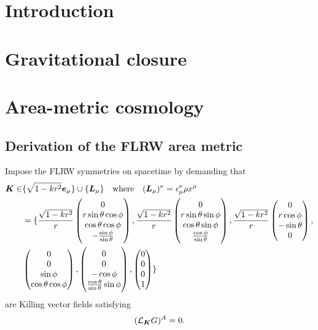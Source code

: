 \chapter{Introduction}\label{ch:intro}

\chapter{Gravitational closure}

\chapter{Area-metric cosmology}

\section{Derivation of the FLRW area metric}

Impose the FLRW symmetries on spacetime by demanding that
\begin{align}
\boldsymbol{K} \in &\{ \sqrt{1-k r{}^2}\boldsymbol{e}_\mu \} \cup \{ \boldsymbol{L}_\mu \} \quad \text{where} \quad (\boldsymbol{L}_\mu)^\nu = \epsilon^\nu_\mu\rho x^\rho \\
&=\{
\frac{\sqrt{1-k r{}^2}}{r}\begin{pmatrix}
0 \\ r\sin{\theta}\cos{\phi} \\ \cos{\theta}\cos{\phi} \\ -\frac{\sin{\phi}}{\sin{\theta}}
\end{pmatrix},
\frac{\sqrt{1-k r{}^2}}{r}\begin{pmatrix}
0 \\ r\sin{\theta}\sin{\phi} \\ \cos{\theta}\sin{\phi} \\ \frac{\cos{\phi}}{\sin{\theta}}
\end{pmatrix},
\frac{\sqrt{1-k r{}^2}}{r}\begin{pmatrix}
0 \\ r\cos{\phi} \\ -\sin{\theta} \\ 0
\end{pmatrix},\\
&\begin{pmatrix}
0 \\ 0 \\ \sin{\phi} \\ \cos{\theta}\cos{\phi}
\end{pmatrix},
\begin{pmatrix}
0 \\ 0 \\ -\cos{\phi} \\ \frac{\cos{\theta}}{\sin{\theta}}\sin{\phi}
\end{pmatrix},
\begin{pmatrix}
0 \\ 0 \\ 0 \\ 1
\end{pmatrix}
 \}
\end{align}
are Killing vector fields satisfying
\begin{equation}
(\mathcal{L}_{\boldsymbol{K}} G)^A=0\mathpunct{.}
\end{equation}

